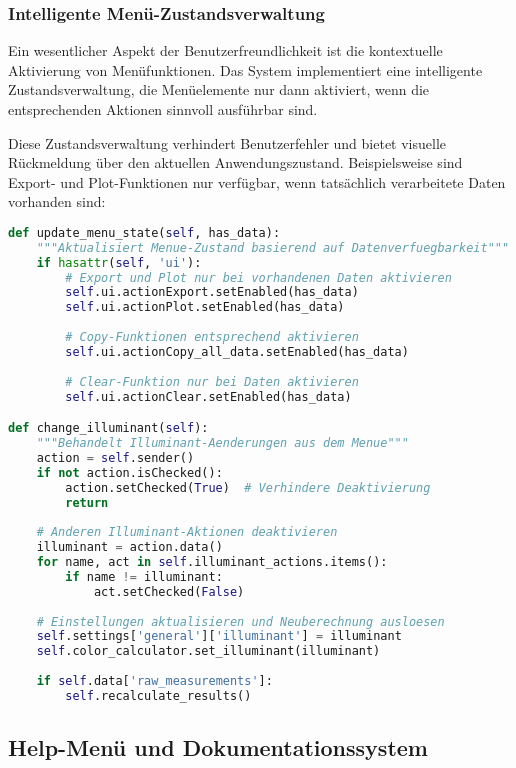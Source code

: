 \subsubsection{Intelligente Menü-Zustandsverwaltung}

Ein wesentlicher Aspekt der Benutzerfreundlichkeit ist die kontextuelle Aktivierung von Menüfunktionen. Das System implementiert eine intelligente Zustandsverwaltung, die Menüelemente nur dann aktiviert, wenn die entsprechenden Aktionen sinnvoll ausführbar sind.

Diese Zustandsverwaltung verhindert Benutzerfehler und bietet visuelle Rückmeldung über den aktuellen Anwendungszustand. Beispielsweise sind Export- und Plot-Funktionen nur verfügbar, wenn tatsächlich verarbeitete Daten vorhanden sind:

\begin{lstlisting}[language=Python, caption=Dynamische Menü-Aktivierung]
def update_menu_state(self, has_data):
    """Aktualisiert Menue-Zustand basierend auf Datenverfuegbarkeit"""
    if hasattr(self, 'ui'):
        # Export und Plot nur bei vorhandenen Daten aktivieren
        self.ui.actionExport.setEnabled(has_data)
        self.ui.actionPlot.setEnabled(has_data)
        
        # Copy-Funktionen entsprechend aktivieren
        self.ui.actionCopy_all_data.setEnabled(has_data)
        
        # Clear-Funktion nur bei Daten aktivieren
        self.ui.actionClear.setEnabled(has_data)

def change_illuminant(self):
    """Behandelt Illuminant-Aenderungen aus dem Menue"""
    action = self.sender()
    if not action.isChecked():
        action.setChecked(True)  # Verhindere Deaktivierung
        return
    
    # Anderen Illuminant-Aktionen deaktivieren
    illuminant = action.data()
    for name, act in self.illuminant_actions.items():
        if name != illuminant:
            act.setChecked(False)
    
    # Einstellungen aktualisieren und Neuberechnung ausloesen
    self.settings['general']['illuminant'] = illuminant
    self.color_calculator.set_illuminant(illuminant)
    
    if self.data['raw_measurements']:
        self.recalculate_results()
\end{lstlisting}

\subsection{Help-Menü und Dokumentationssystem}

